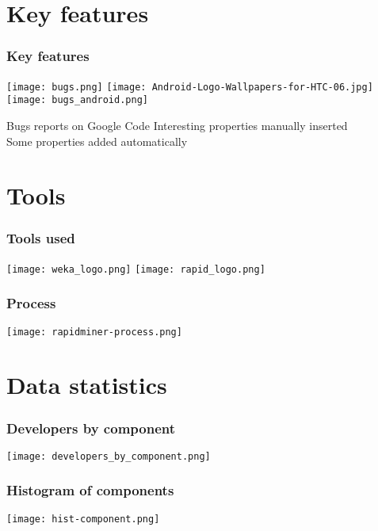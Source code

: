 \section{Key features} %
\label{sec:use_label_otherwise no content}
\begin{frame}\frametitle{Key features} 
\texttt{[image: bugs.png]} 
\texttt{[image: Android-Logo-Wallpapers-for-HTC-06.jpg]}
\\
\texttt{[image: bugs\_android.png]}
  \begin{block}{Bugs reports on Google Code}
   Interesting properties manually inserted \\
   Some properties added automatically 
  \end{block}
\end{frame}

\section{Tools} %
\label{sec:Tools}

\begin{frame}\frametitle{Tools used} 
\texttt{[image: weka\_logo.png]}
\texttt{[image: rapid\_logo.png]}
\end{frame}

\begin{frame}\frametitle{Process} 
\texttt{[image: rapidminer-process.png]}
\end{frame}

\section{Data statistics} %
\begin{frame}\frametitle{Developers by component} 
\texttt{[image: developers\_by\_component.png]}
\end{frame}

\begin{frame}\frametitle{Histogram of components} 
\begin{center}
\texttt{[image: hist-component.png]}
\end{center}
\end{frame}

